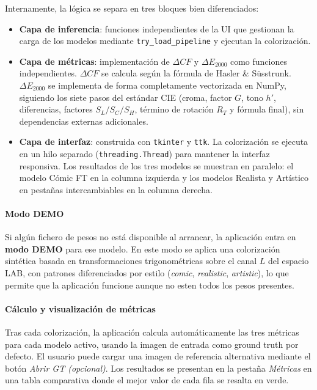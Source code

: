 \documentclass[a4paper]{article}
\begin{document}
Internamente, la lógica se separa en tres bloques bien diferenciados:

\begin{itemize}
  \item \textbf{Capa de inferencia}: funciones independientes de la UI que gestionan la carga de los modelos mediante \texttt{try\_load\_pipeline} y ejecutan la colorización.

  \item \textbf{Capa de métricas}: implementación de $\Delta CF$ y $\Delta E_{2000}$ como funciones independientes. $\Delta CF$ se calcula según la fórmula de Hasler \& Süsstrunk. $\Delta E_{2000}$ se implementa de forma completamente vectorizada en NumPy, siguiendo los siete pasos del estándar CIE (croma, factor $G$, tono $h'$, diferencias, factores $S_L/S_C/S_H$, término de rotación $R_T$ y fórmula final), sin dependencias externas adicionales.

  \item \textbf{Capa de interfaz}: construida con \texttt{tkinter} y \texttt{ttk}. La colorización se ejecuta en un hilo separado (\texttt{threading.Thread}) para mantener la interfaz responsiva. Los resultados de los tres modelos se muestran en paralelo: el modelo Cómic FT en la columna izquierda y los modelos Realista y Artístico en pestañas intercambiables en la columna derecha.
\end{itemize}

\paragraph{Modo DEMO}

Si algún fichero de pesos no está disponible al arrancar, la aplicación entra en \textbf{modo DEMO} para ese modelo. En este modo se aplica una colorización sintética basada en transformaciones trigonométricas sobre el canal $L$ del espacio LAB, con patrones diferenciados por estilo (\textit{comic}, \textit{realistic}, \textit{artistic}), lo que permite que la aplicación funcione aunque no esten todos los pesos presentes.

\paragraph{Cálculo y visualización de métricas}

Tras cada colorización, la aplicación calcula automáticamente las tres métricas para cada modelo activo, usando la imagen de entrada como ground truth por defecto. El usuario puede cargar una imagen de referencia alternativa mediante el botón \textit{Abrir GT (opcional)}. Los resultados se presentan en la pestaña \textit{Métricas} en una tabla comparativa donde el mejor valor de cada fila se resalta en verde.
\end{document}
